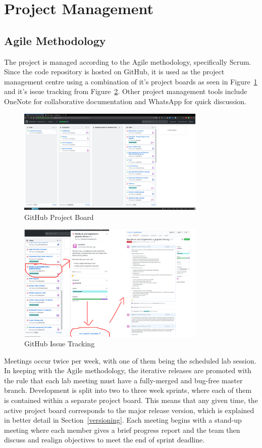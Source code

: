 \documentclass{ueacmpstyle}
\begin{document}
\section{Project Management}
\subsection{Agile Methodology}
The project is managed according to the Agile methodology, specifically Scrum. Since the code repository is hosted on GitHub, it is used as the project management centre using a combination of it's project boards as seen in Figure~\ref{gitboard} and it's issue tracking from Figure~\ref{gitissue}. Other project management tools include OneNote for collaborative documentation and WhatsApp for quick discussion.

\begin{figure}[H]
	\caption{GitHub Project Board}\label{gitboard}
	\centering
	\includegraphics[width=0.8\textwidth]{gitproj}
\end{figure}

\begin{figure}[H]
	\caption{GitHub Issue Tracking}\label{gitissue}
	\centering
	\includegraphics[width=0.8\textwidth]{gitissuetrack}
\end{figure}

Meetings occur twice per week, with one of them being the scheduled lab session. In keeping with the Agile methodology, the iterative releases are promoted with the rule that each lab meeting must have a fully-merged and bug-free master branch. 
Development is split into two to three week sprints, where each of them is contained within a separate project board. This means that any given time, the active project board corresponds to the major release version, which is explained in better detail in Section~\ref{versioning}.  Each meeting begins with a stand-up meeting where each member gives a brief progress report and the team then discuss and realign objectives to meet the end of sprint deadline.
\end{document}
